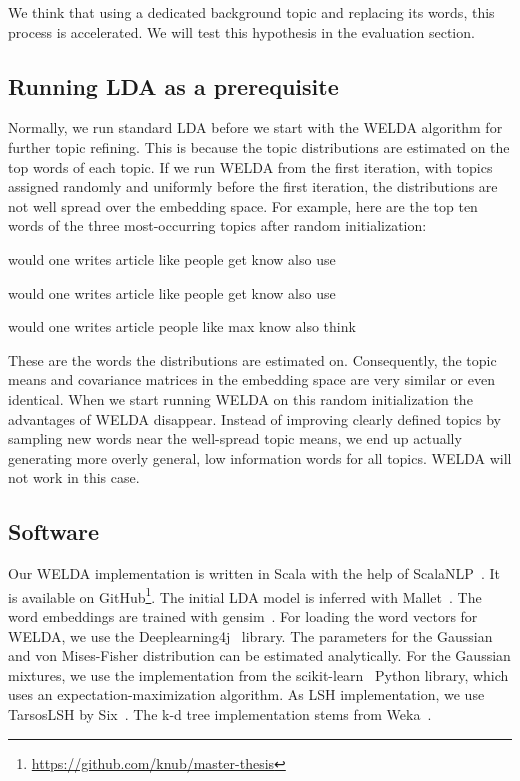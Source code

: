 \documentclass[
        a4paper,
        titlepage,
        twoside,
        parskip,
        numbers=noenddot
        ]{scrbook}
\newcommand{\topicbox}[1]{
  \setlength{\OuterFrameSep}{0pt}
  \begin{framed}
    #1
  \end{framed}
}
\theoremstyle{break}
\begin{document}
We think that using a dedicated background topic and replacing its words, this process is accelerated.
We will test this hypothesis in the evaluation section.

\subsection{Running LDA as a prerequisite}
Normally, we run standard LDA before we start with the WELDA algorithm for further topic refining.
This is because the topic distributions are estimated on the top words of each topic.
If we run WELDA from the first iteration, with topics assigned randomly and uniformly before the first iteration, the distributions are not well spread over the embedding space.
For example, here are the top ten words of the three most-occurring topics after random initialization:
\topicbox{
  would one writes article like people get know also use \par
  would one writes article like people get know also use \par
  would one writes article people like max know also think
}

These are the words the distributions are estimated on.
Consequently, the topic means and covariance matrices in the embedding space are very similar or even identical.
When we start running WELDA on this random initialization the advantages of WELDA disappear.
Instead of improving clearly defined topics by sampling new words near the well-spread topic means, we end up actually generating more overly general, low information words for all topics.
WELDA will not work in this case.

\subsection{Software}

Our WELDA implementation is written in Scala with the help of ScalaNLP~\cite{ScalaNlp2009}.
It is available on GitHub\footnote{\url{https://github.com/knub/master-thesis}}.
The initial LDA model is inferred  with Mallet~\cite{McCallum2002}.
The word embeddings are trained with gensim~\cite{Rehurek2010}.
For loading the word vectors for WELDA, we use the Deeplearning4j~\cite{DL4J2016} library.
The parameters for the Gaussian and von Mises-Fisher distribution can be estimated analytically.
For the Gaussian mixtures, we use the implementation from the scikit-learn~\cite{Pedregosa2012} Python library, which uses an expectation-maximization algorithm.
As LSH implementation, we use TarsosLSH by Six~\cite{Six2016}.
The k-d tree implementation stems from Weka~\cite{Hall2009}.
\end{document}
